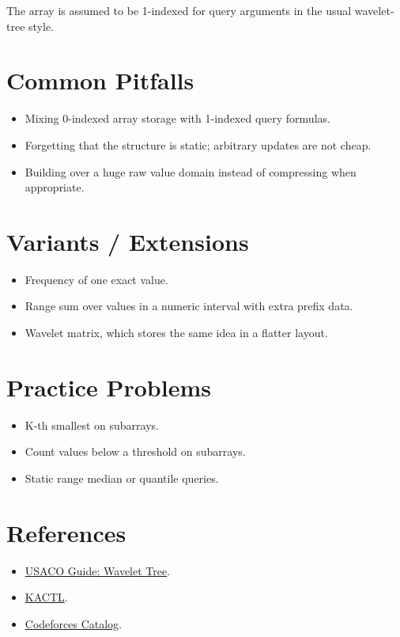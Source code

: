 The array is assumed to be 1-indexed for query arguments in the usual wavelet-tree style.

\section*{Common Pitfalls}

\begin{itemize}
  \item Mixing 0-indexed array storage with 1-indexed query formulas.
  \item Forgetting that the structure is static; arbitrary updates are not cheap.
  \item Building over a huge raw value domain instead of compressing when appropriate.
\end{itemize}

\section*{Variants / Extensions}

\begin{itemize}
  \item Frequency of one exact value.
  \item Range sum over values in a numeric interval with extra prefix data.
  \item Wavelet matrix, which stores the same idea in a flatter layout.
\end{itemize}

\section*{Practice Problems}

\begin{itemize}
  \item K-th smallest on subarrays.
  \item Count values below a threshold on subarrays.
  \item Static range median or quantile queries.
\end{itemize}

\section*{References}

\begin{itemize}
  \item \href{https://usaco.guide/adv/wavelet}{USACO Guide: Wavelet Tree}.
  \item \href{https://github.com/kth-competitive-programming/kactl}{KACTL}.
  \item \href{https://codeforces.com/catalog}{Codeforces Catalog}.
\end{itemize}
